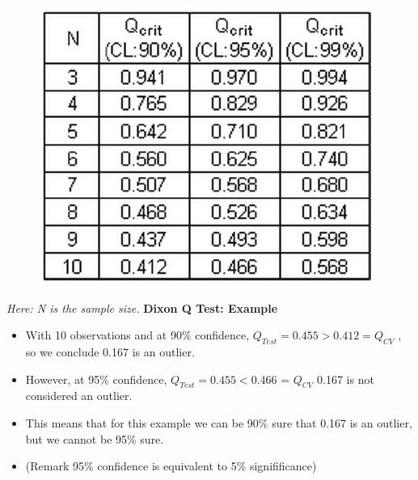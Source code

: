 \documentclass[a4paper,12pt]{article}
\begin{document}
\begin{figure}
	\centering
	\includegraphics[width=0.8\linewidth]{images/DixonQTestTables}
	\caption{}
	\label{fig:dixonqtesttables}
\end{figure}

\textit{Here: N is the sample size.}
\Large
\textbf{Dixon Q Test: Example}\\
\begin{itemize}
	\item	With 10 observations and at 90\% confidence, $Q_{Test} = 0.455 > 0.412 =Q_{CV}$ , so we conclude 0.167 is an outlier.
	\item  However, at 95\% confidence, $Q_{Test} = 0.455 < 0.466$ = $Q_{CV}$ 0.167 is not considered an outlier. 
	
	\item This means that for this example we can be 90\% sure that 0.167 is an outlier, but we cannot be 95\% sure.
	\bigskip
	\item (Remark 95\% confidence is equivalent to 5\% signifificance)
\end{itemize}	



\end{document}
